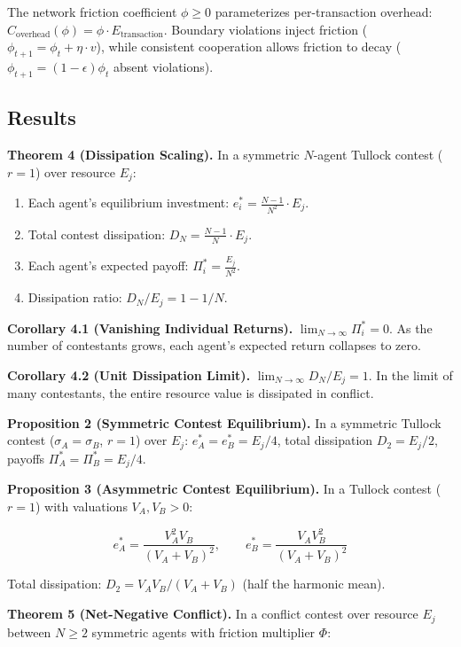 \documentclass[11pt]{article}
\begin{document}
The network friction coefficient \(\phi \geq 0\) parameterizes
per-transaction overhead:
\(C_{\text{overhead}}(\phi) = \phi \cdot E_{\text{transaction}}\).
Boundary violations inject friction
(\(\phi_{t+1} = \phi_t + \eta \cdot v\)), while consistent cooperation
allows friction to decay (\(\phi_{t+1} = (1 - \epsilon)\phi_t\) absent
violations).

\subsection{Results}\label{results}

\textbf{Theorem 4 (Dissipation Scaling).} In a symmetric \(N\)-agent
Tullock contest (\(r = 1\)) over resource \(E_j\):

\begin{enumerate}
\def\labelenumi{(\alph{enumi})}
\item
  Each agent's equilibrium investment:
  \(e_i^* = \frac{N-1}{N^2} \cdot E_j\).
\item
  Total contest dissipation: \(D_N = \frac{N-1}{N} \cdot E_j\).
\item
  Each agent's expected payoff: \(\Pi_i^* = \frac{E_j}{N^2}\).
\item
  Dissipation ratio: \(D_N / E_j = 1 - 1/N\).
\end{enumerate}

\textbf{Corollary 4.1 (Vanishing Individual Returns).}
\(\lim_{N \to \infty} \Pi_i^* = 0\). As the number of contestants grows,
each agent's expected return collapses to zero.

\textbf{Corollary 4.2 (Unit Dissipation Limit).}
\(\lim_{N \to \infty} D_N / E_j = 1\). In the limit of many contestants,
the entire resource value is dissipated in conflict.

\textbf{Proposition 2 (Symmetric Contest Equilibrium).} In a symmetric
Tullock contest (\(\sigma_A = \sigma_B\), \(r = 1\)) over \(E_j\):
\(e_A^* = e_B^* = E_j/4\), total dissipation \(D_2 = E_j/2\), payoffs
\(\Pi_A^* = \Pi_B^* = E_j/4\).

\textbf{Proposition 3 (Asymmetric Contest Equilibrium).} In a Tullock
contest (\(r = 1\)) with valuations \(V_A, V_B > 0\):

\[e_A^* = \frac{V_A^2 V_B}{(V_A + V_B)^2}, \qquad e_B^* = \frac{V_A V_B^2}{(V_A + V_B)^2}\]

Total dissipation: \(D_2 = V_A V_B / (V_A + V_B)\) (half the harmonic
mean).

\textbf{Theorem 5 (Net-Negative Conflict).} In a conflict contest over
resource \(E_j\) between \(N \geq 2\) symmetric agents with friction
multiplier \(\Phi\):
\end{document}
